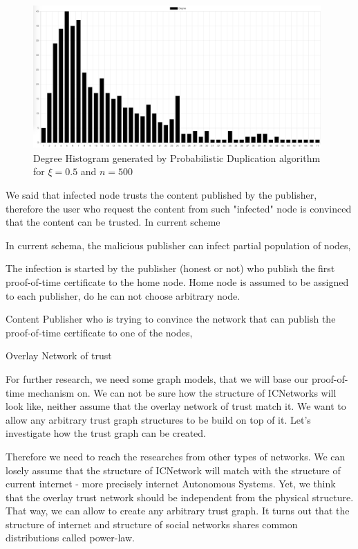 \documentclass[nostrict]{szablonPG}
\begin{document}
\begin{figure}[h!]
    \includegraphics[width=11cm]{img/propDup500Hist.png}
    \centering
    \caption{Degree Histogram generated by Probabilistic Duplication algorithm for $\xi=0.5$ and $n = 500$}
    \label{fig:propdup500histogram}
\end{figure} 

We said that infected node trusts the content published by the publisher, therefore the user who request the content from such "infected" node is convinced that the content can be trusted. In current scheme 

In current schema, the malicious publisher can infect partial population of nodes, 

The infection is started by the publisher (honest or not) who publish the first proof-of-time certificate to the home node. Home node is assumed to be assigned to each publisher, do he can not choose arbitrary node. 


Content Publisher who is trying to convince the network that can publish the proof-of-time certificate to one of the nodes, 

Overlay Network of trust

For further research, we need some graph models, that we will base our proof-of-time mechanism on. We can not be sure how the structure of ICNetworks will look like, neither assume that the overlay network of trust match it. We want to allow any arbitrary trust graph structures to be build on top of it. Let's investigate how the trust graph can be created. 

Therefore we need to reach the researches from other types of networks. We can losely assume that the structure of ICNetwork will match with the structure of current internet - more precisely internet Autonomous Systems. Yet, we think that the overlay trust network should be independent from the physical structure.  That way, we can allow to create any arbitrary trust graph. It turns out that the structure of internet and structure of social networks shares common distributions called power-law. 
\end{document}
